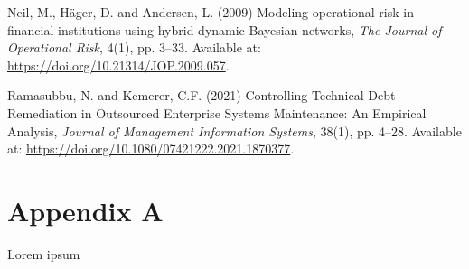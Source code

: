 \documentclass[
  11pt,
  letterpaper,
  11pt,
  oneside,
  english,
  onehalfspacing,
  headsepline]{MastersDoctoralThesis}
\newlength{\cslhangindent}
\newenvironment{CSLReferences}[2] %
 {\begin{list}{}{%
  \setlength{\itemindent}{0pt}
  \setlength{\leftmargin}{0pt}
  \setlength{\parsep}{0pt}
  \ifodd #1
   \setlength{\leftmargin}{\cslhangindent}
   \setlength{\itemindent}{-1\cslhangindent}
  \fi
  \setlength{\itemsep}{#2\baselineskip}}}
 {\end{list}}
\begin{document}
\begin{CSLReferences}{0}{1}
Neil, M., Häger, D. and Andersen, L. (2009) \textquotesingle Modeling
operational risk in financial institutions using hybrid dynamic
{Bayesian} networks\textquotesingle, \emph{The Journal of Operational
Risk}, 4(1), pp. 3--33. Available at:
\url{https://doi.org/10.21314/JOP.2009.057}.

Ramasubbu, N. and Kemerer, C.F. (2021) \textquotesingle Controlling
{Technical Debt Remediation} in {Outsourced Enterprise Systems
Maintenance}: {An Empirical Analysis}\textquotesingle, \emph{Journal of
Management Information Systems}, 38(1), pp. 4--28. Available at:
\url{https://doi.org/10.1080/07421222.2021.1870377}.

\end{CSLReferences}

\cleardoublepage
{}
{}
\appendix

\chapter{Appendix A}\label{appendix-a}

Lorem ipsum
\end{document}
